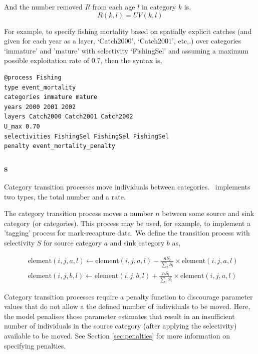 And the number removed $R$ from each age $l$ in category $k$ is,
\begin{equation}
  R(k,l) = UV(k,l)
\end{equation}

For example, to specify fishing mortality based on spatially explicit catches (and given for each year as a layer, `Catch2000', `Catch2001', etc,.) over categories `immature' and 'mature' with selectivity `FishingSel' and assuming a maximum possible exploitation rate of 0.7, then the syntax is,

\begin{verbatim}
@process Fishing
type event_mortality
categories immature mature
years 2000 2001 2002
layers Catch2000 Catch2001 Catch2002
U_max 0.70
selectivities FishingSel FishingSel FishingSel
penalty event_mortality_penalty
\end{verbatim}


\subsubsection{s}

Category transition processes move individuals between categories. \SPM\ implements two types, the total number and a rate. 

The category transition process moves a number $n$ between some source and sink category (or categories). This process may be used, for example, to implement a 'tagging' process for mark-recapture data. We define the transition process with selectivity $S$ for source category $a$ and sink category $b$ as,

\begin{equation}\begin{split}
  & \text{element}(i,j,a,l) \leftarrow \text{element}(i,j,a,l) - \frac{nS_l}{\sum\limits_l S_l} \times \text{element}(i,j,a,l) \\
  & \text{element}(i,j,b,l) \leftarrow \text{element}(i,j,b,l) + \frac{nS_l}{\sum\limits_l S_l} \times \text{element}(i,j,a,l)
\end{split}\end{equation}

Category transition processes require a penalty function to discourage parameter values that do not allow a the defined number of individuals to be moved. Here, the model penalises those parameter estimates that result in an insufficient number of individuals in the source category (after applying the selectivity) available to be moved. See Section \ref{sec:penalties} for more information on specifying penalties.

